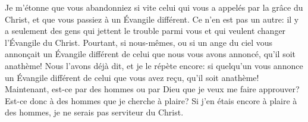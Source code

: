 Je m’étonne que vous abandonniez si vite celui qui vous a appelés par la grâce du Christ,
	et que vous passiez à un Évangile différent.
Ce n’en est pas un autre:
	il y a seulement des gens qui jettent le trouble parmi vous
	et qui veulent changer l’Évangile du Christ.
Pourtant, si nous-mêmes, ou si un ange du ciel
		vous annonçait un Évangile différent de celui que nous vous avons annoncé,
	qu’il soit anathème!
Nous l’avons déjà dit, et je le répète encore:
	si quelqu’un vous annonce un Évangile différent de celui que vous avez reçu,
	qu’il soit anathème!
Maintenant, est-ce par des hommes ou par Dieu que je veux me faire approuver?
Est-ce donc à des hommes que je cherche à plaire?
Si j’en étais encore à plaire à des hommes, je ne serais pas serviteur du Christ.
